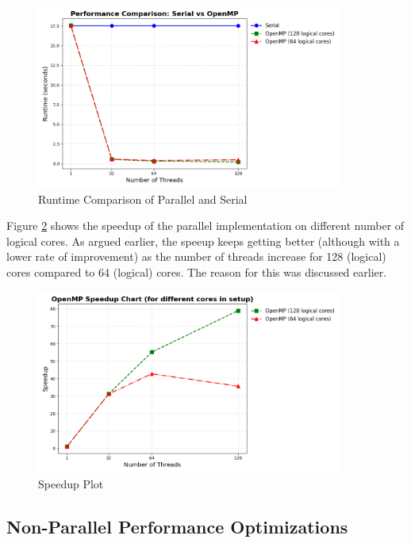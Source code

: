 \documentclass[a4paper,10pt]{article}
\begin{document}
\begin{figure}[H]
  \centering
  \includegraphics[width=0.9\textwidth]{img/ex4/performance_comparison.png}
  \caption{Runtime Comparison of Parallel and Serial}
  \label{fig:ex4_performance}
\end{figure}

Figure \ref{fig:ex4_speedup} shows the speedup of the parallel implementation on different number of logical cores. As argued earlier, the speeup keeps getting better (although with a lower rate of improvement) as the number of threads increase for 128 (logical) cores compared to 64 (logical) cores. The reason for this was discussed earlier.
\begin{figure}[H]
  \centering
  \includegraphics[width=0.9\textwidth]{img/ex4/speedup_plot.png}
  \caption{Speedup Plot}
  \label{fig:ex4_speedup}
\end{figure}



\subsection{Non-Parallel Performance Optimizations}
\end{document}

